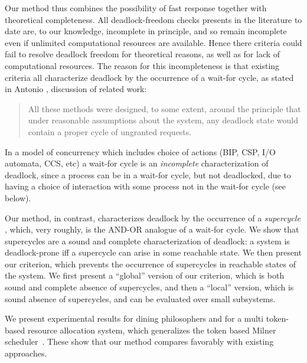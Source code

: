 Our method thus combines the possibility of fast response together with theoretical completeness.
All deadlock-freedom checks presents in the literature to date are, to our knowledge, incomplete in
principle, and so remain incomplete even if unlimited computational resources are available.
Hence there criteria could fail to resolve deadlock freedom for theoretical reasons, as well as for 
lack of computational resources.
%
The reason for this incompleteness is that existing criteria all characterize deadlock by the
occurrence of a wait-for cycle, \eg as stated in Antonio \etal \cite{AGR16}, discussion of related
work:
\begin{quote}
All these methods were designed, to some extent, around the principle that under reasonable
assumptions about the system, any deadlock state would contain a proper cycle of ungranted requests.
\end{quote}
In a model of concurrency which includes choice of actions
(\eg BIP, CSP, I/O automata, CCS, etc) a wait-for cycle is an \emph{incomplete} characterization of
deadlock, since a process can be in a wait-for cycle, but not deadlocked, due to having a choice of
interaction with some process not in the wait-for cycle (see  below).

Our method, in contrast, characterizes deadlock by the occurrence of a \emph{supercycle}
\cite{AE98,AC05}, which, very roughly, is the AND-OR analogue of a wait-for cycle. We show that
supercycles are a sound and complete characterization of deadlock: a system is deadlock-prone iff a
supercycle can arise in some reachable state.
%
We then present our criterion, which prevents the occurrence of supercycles in reachable states of
the system. We first present a ``global'' version of our criterion, which is both sound and complete
\wrt absence of supercycles, and then a ``local'' version, which is sound \wrt absence of
supercycles, and can be evaluated over small subsystems.

We present experimental results for dining philosophers and for a multi token-based resource
allocation system, which generalizes the token based Milner scheduler~\cite{milner}.  These show
that our method compares favorably with existing approaches.








